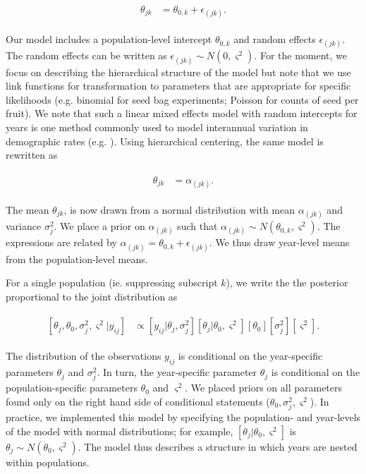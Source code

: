 \documentclass[12pt, oneside, titlepage]{article}   	%
\begin{document}
{\begin{align}
  \begin{split}
  \theta_{jk} &  = \theta_{0,k} +\epsilon_{(jk)}.
  \end{split}
\end{align}

Our model includes a population-level intercept $\theta_{0,k}$ and random effects $\epsilon_{(jk)}$. The random effects can be written as  $\epsilon_{(jk)}\sim N(0, \varsigma^2)$. For the moment, we focus on describing the hierarchical structure of the model but note that we use link functions for transformation to parameters that are appropriate for specific likelihoods (e.g. binomial for seed bag experiments; Poisson for counts of seed per fruit). We note that such a linear mixed effects model with random intercepts for years is one method commonly used to model interannual variation in demographic rates (e.g. \cite{metcalf2015}). Using hierarchical centering, the same model is rewritten as 

\begin{align}
  \begin{split}
  \theta_{jk} &  = \alpha_{(jk)}.
  \end{split}
\end{align}

The mean $\theta_{jk}$, is now drawn from a normal distribution with mean $\alpha_{(jk)}$ and variance $\sigma^2_j$. We place a prior on $\alpha_{(jk)}$ such that $\alpha_{(jk)}\sim N(\theta_{0,k}, \varsigma^2)$. The expressions are related by $\alpha_{(jk)}=\theta_{0,k}+\epsilon_{(jk)}$. We thus draw year-level means from the population-level means. 

For a single population (ie. suppressing subscript $k$), we write the the posterior proportional to the joint distribution as

\begin{align}
  \begin{split}
  [ \theta_j , \theta_0 , \sigma_j^2 , \varsigma^2 | y_{ij} ] &  \propto [ y_{ij} | \theta_j , \sigma^2_j] [ \theta_j | \theta_0 , \varsigma^2 ] [ \theta_0 ] [ \sigma^2_j] [ \varsigma^2].
  \end{split}
\end{align}

The distribution of the observations $y_{ij}$ is conditional on the year-specific parameters $\theta_j$ and $\sigma^2_j$. In turn, the year-specific parameter $\theta_j$ is conditional on the population-specific parameters $\theta_0$ and $ \varsigma^2$. We placed priors on all parameters found only on the right hand side of conditional statements ($\theta_0, \sigma^2_j, \varsigma^2$). In practice, we implemented this model by specifying the population- and year-levels of the model with normal distributions; for example, $[ \theta_j | \theta_0 , \varsigma^2 ]$ is $\theta_j \sim N(\theta_0, \varsigma^2)$. The model thus describes a structure in which years are nested within populations.

}
\end{document}
